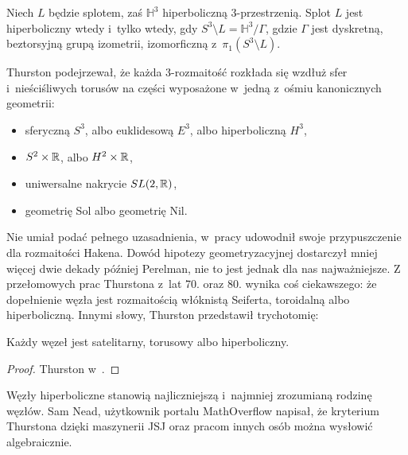 \begin{proposition}
    Niech $L$ będzie splotem, zaś $\mathbb H^3$ hiperboliczną 3-przestrzenią.
    Splot $L$ jest hiperboliczny wtedy i~tylko wtedy, gdy $S^3 \setminus L = \mathbb H^3 / \Gamma$, gdzie $\Gamma$ jest dyskretną, beztorsyjną grupą izometrii, izomorficzną z~$\pi_1(S^3 \setminus L)$.
\end{proposition}

Thurston podejrzewał, że każda 3-rozmaitość rozkłada się wzdłuż sfer i~nieściśliwych torusów na części wyposażone w~jedną z~ośmiu kanonicznych geometrii:
\begin{itemize}
\item sferyczną $S^3$, albo euklidesową $E^3$, albo hiperboliczną $H^3$,
\item $S^2 \times \mathbb R$, albo $H^2 \times \mathbb R$,
\item uniwersalne nakrycie $SL(2, \mathbb R)$,
\item geometrię Sol albo geometrię Nil.
\end{itemize}
Nie umiał podać pełnego uzasadnienia, w~pracy \cite{thurston82} udowodnił swoje przypuszczenie dla rozmaitości Hakena.
Dowód hipotezy geometryzacyjnej dostarczył mniej więcej dwie dekady później Perelman, nie to jest jednak dla nas najważniejsze.
Z przełomowych prac Thurstona z~lat 70. oraz 80. wynika coś ciekawszego: że dopełnienie węzła jest rozmaitością włóknistą Seiferta, toroidalną albo hiperboliczną.
Innymi słowy, Thurston przedstawił trychotomię:

\begin{theorem}
    Każdy węzeł jest satelitarny, torusowy albo hiperboliczny.
\end{theorem}

\begin{proof}
    Thurston w~\cite{thurston82}.
\end{proof}

Węzły hiperboliczne stanowią najliczniejszą i~najmniej zrozumianą rodzinę węzłów.
Sam Nead, użytkownik portalu MathOverflow napisał, że kryterium Thurstona dzięki maszynerii JSJ oraz pracom innych osób można wysłowić algebraicznie.

